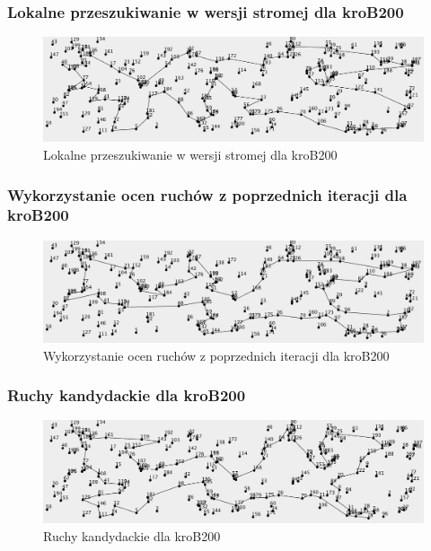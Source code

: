 \documentclass[a4paper]{article}
\begin{document}
\subsubsection{Lokalne przeszukiwanie w wersji stromej dla kroB200}

\begin{figure}[H]
\centering
\includegraphics[width=\textwidth]{lab3/kroB_steepest_corners.png}
\caption{Lokalne przeszukiwanie w wersji stromej dla kroB200}
\end{figure}

\subsubsection{Wykorzystanie ocen ruchów z poprzednich iteracji dla kroB200}

\begin{figure}[H]
\centering
\includegraphics[width=\textwidth]{lab3/kroB_list_moves.png}
\caption{Wykorzystanie ocen ruchów z poprzednich iteracji dla kroB200}
\end{figure}

\subsubsection{Ruchy kandydackie dla kroB200}

\begin{figure}[H]
\centering
\includegraphics[width=\textwidth]{lab3/kroB_candidate_moves.png}
\caption{Ruchy kandydackie dla kroB200}
\end{figure}
\end{document}
